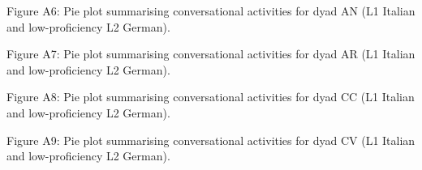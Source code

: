\begin{stylecaption}
Figure A6: Pie plot summarising conversational activities for dyad AN (L1 Italian and low-proficiency L2 German).
\end{stylecaption}

\begin{stylecaption}
  
 
\end{stylecaption}

\begin{stylecaption}
Figure A7: Pie plot summarising conversational activities for dyad AR (L1 Italian and low-proficiency L2 German).
\end{stylecaption}

\begin{stylecaption}
  
 
\end{stylecaption}

\begin{stylecaption}
Figure A8: Pie plot summarising conversational activities for dyad CC (L1 Italian and low-proficiency L2 German).
\end{stylecaption}

\begin{stylecaption}
  
 
\end{stylecaption}

\begin{stylecaption}
Figure A9: Pie plot summarising conversational activities for dyad CV (L1 Italian and low-proficiency L2 German).
\end{stylecaption}

\begin{stylecaption}
  
 
\end{stylecaption}

